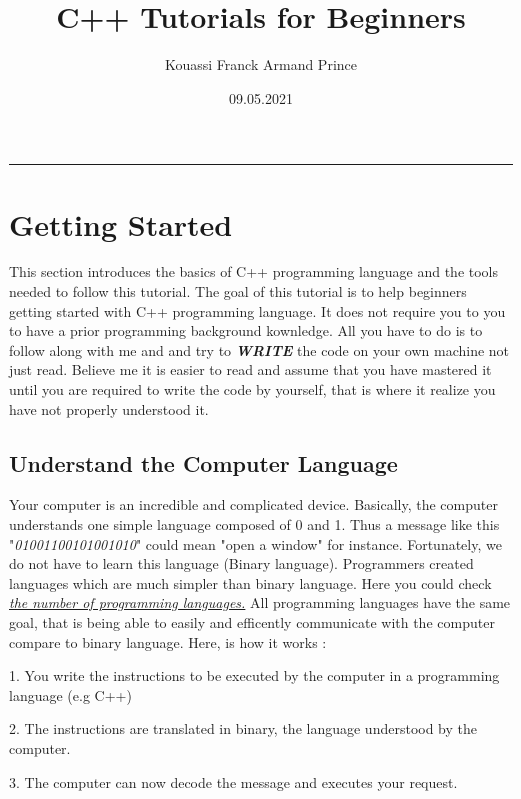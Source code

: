\documentclass[11pt, a4paper]{article}
\title{C++ Tutorials for Beginners}
\author{Kouassi Franck Armand Prince
\date{09.05.2021}
}
\begin{document}
\maketitle\hrule
\newpage

\tableofcontents
\listoffigures
\lstlistoflistings
\pagebreak

\section{Getting Started}
This section introduces the basics of C++ programming language and the tools
needed to follow this tutorial. The goal of this tutorial is to help beginners
getting started with C++ programming language. It does not require you to you to
have a prior programming background kownledge. All you have to do is to follow along
with me and and try to \textbf{\textit{WRITE}} the code on your own machine not just read.
Believe me it is easier to read and assume that you have mastered it until you are required
to write the code by yourself, that is where it realize you have not properly understood it.

\subsection{Understand the Computer Language}
Your computer is an incredible and complicated device. Basically, the computer
understands one simple language composed of 0 and 1. Thus a message like this
"\textit{01001100101001010}" could mean "open a window" for instance. Fortunately, we do not have
to learn this language (Binary language). Programmers created languages which are much simpler
than binary language. Here you could check \href{https://en.wikipedia.org/wiki/List_of_programming_languages}
{\emph{\textit{the number of programming languages.}}} \newline
All programming languages have the same goal, that is being able to easily and efficently
communicate with the computer compare to binary language. Here, is how it works :

1. You write the instructions to be executed by the computer in a programming language (e.g C++)

2. The instructions are translated in binary, the language understood by the computer.

3. The computer can now decode the message and executes your request.
\end{document}
